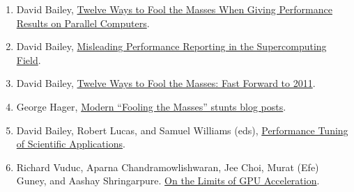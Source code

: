 \documentclass[12pt, leqno]{article} %
\begin{document}
\begin{enumerate}
\item
  David Bailey,
  \href{http://www.davidhbailey.com/dhbpapers/twelve-ways.pdf}{Twelve
  Ways to Fool the Masses When Giving Performance Results on Parallel
  Computers}.
\item
  David Bailey,
  \href{http://www.davidhbailey.com/dhbpapers/mislead.pdf}{Misleading
  Performance Reporting in the Supercomputing Field}.
\item
  David Bailey,
  \href{http://www.davidhbailey.com/dhbtalks/dhb-12ways.pdf}{Twelve Ways
  to Fool the Masses: Fast Forward to 2011}.
\item
  George Hager,
  \href{http://blogs.fau.de/hager/archives/category/fooling-the-masses}{Modern
  ``Fooling the Masses'' stunts blog posts}.
\item
  David Bailey, Robert Lucas, and Samuel Williams (eds),
  \href{http://www.amazon.com/Performance-Scientific-Applications-Chapman-Computational-ebook/dp/B00UV98OHG}{Performance
  Tuning of Scientific Applications}.
\item
  Richard Vuduc, Aparna Chandramowlishwaran, Jee Choi, Murat (Efe)
  Guney, and Aashay Shringarpure.
  \href{http://newport.eecs.uci.edu/~amowli/resources/papers/vuduc2010-hotpar.pdf}{On
  the Limits of GPU Acceleration}.
\end{enumerate}
\end{document}
